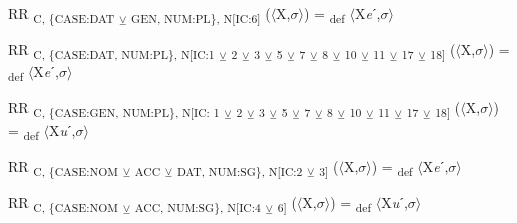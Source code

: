 {\begin{exe}
 RR \textsubscript{C, \{CASE:DAT} \textsubscript{${\veebar}$}\textsubscript{ GEN, NUM:PL\}, N[IC:6]} ($\langle$X,$\sigma $$\rangle$) = \textsubscript{def} $\langle$X\textit{e}ˊ,$\sigma $$\rangle$
\end{exe}

\begin{exe}
 RR \textsubscript{C, \{CASE:DAT, NUM:PL\}, N[IC:1} \textsubscript{${\veebar}$}\textsubscript{ 2} \textsubscript{${\veebar}$}\textsubscript{ 3} \textsubscript{${\veebar}$}\textsubscript{ 5} \textsubscript{${\veebar}$}\textsubscript{ 7} \textsubscript{${\veebar}$}\textsubscript{ 8} \textsubscript{${\veebar}$}\textsubscript{ 10} \textsubscript{${\veebar}$}\textsubscript{ 11} \textsubscript{${\veebar}$}\textsubscript{ 17} \textsubscript{${\veebar}$}\textsubscript{ 18]} ($\langle$X,$\sigma $$\rangle$) = \textsubscript{def} $\langle$X\textit{e}ˊ,$\sigma $$\rangle$
\end{exe}

\begin{exe}
 RR \textsubscript{C, \{CASE:GEN, NUM:PL\}, N[IC: 1} \textsubscript{${\veebar}$}\textsubscript{ 2} \textsubscript{${\veebar}$}\textsubscript{ 3} \textsubscript{${\veebar}$}\textsubscript{ 5} \textsubscript{${\veebar}$}\textsubscript{ 7} \textsubscript{${\veebar}$}\textsubscript{ 8} \textsubscript{${\veebar}$}\textsubscript{ 10} \textsubscript{${\veebar}$}\textsubscript{ 11} \textsubscript{${\veebar}$}\textsubscript{ 17} \textsubscript{${\veebar}$}\textsubscript{ 18]} ($\langle$X,$\sigma $$\rangle$) = \textsubscript{def} $\langle$X\textit{u}ˊ,$\sigma $$\rangle$
\end{exe}

\begin{exe}
 RR \textsubscript{C, \{CASE:NOM} \textsubscript{${\veebar}$}\textsubscript{ ACC} \textsubscript{${\veebar}$}\textsubscript{ DAT, NUM:SG\}, N[IC:2} \textsubscript{${\veebar}$}\textsubscript{ 3]} ($\langle$X,$\sigma $$\rangle$) = \textsubscript{def} $\langle$X\textit{e}ˊ,$\sigma $$\rangle$
\end{exe}

\begin{exe}
 RR \textsubscript{C, \{CASE:NOM} \textsubscript{${\veebar}$}\textsubscript{ ACC, NUM:SG\}, N[IC:4} \textsubscript{${\veebar}$}\textsubscript{ 6]} ($\langle$X,$\sigma $$\rangle$) = \textsubscript{def} $\langle$X\textit{u}ˊ,$\sigma $$\rangle$
\end{exe}

}
